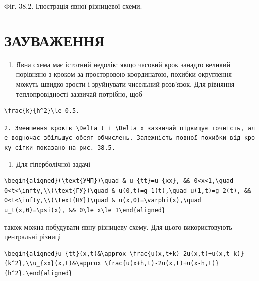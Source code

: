 \documentclass[
  ukrainian,
]{article}
\providecommand{\tightlist}{%
  \setlength{\itemsep}{0pt}\setlength{\parskip}{0pt}}
\begin{document}
Фіг. 38.2. Ілюстрація явної різницевої схеми.

\section{ЗАУВАЖЕННЯ}\label{ux437ux430ux443ux432ux430ux436ux435ux43dux43dux44f-9}

\begin{enumerate}
\def\labelenumi{\arabic{enumi}.}
\tightlist
\item
  Явна схема має істотний недолік: якщо часовий крок занадто великий
  порівняно з кроком за просторовою координатою, похибки округлення
  можуть швидко зрости і зруйнувати чисельний розв'язок. Для рівняння
  теплопровідності зазвичай потрібно, щоб
\end{enumerate}

\begin{verbatim}
\frac{k}{h^2}\le 0.5.
\end{verbatim}

\texttt{2.\ Зменшення\ кроків\ \textquotesingle{}\textbackslash{}Delta\ t\textquotesingle{}\ і\ \textquotesingle{}\textbackslash{}Delta\ x\textquotesingle{}\ зазвичай\ підвищує\ точність,\ але\ водночас\ збільшує\ обсяг\ обчислень.\ Залежність\ повної\ похибки\ від\ кроку\ сітки\ показано\ на\ рис.\ 38.5.}

\begin{enumerate}
\def\labelenumi{\arabic{enumi}.}
\setcounter{enumi}{2}
\tightlist
\item
  Для гіперболічної задачі
\end{enumerate}

\begin{verbatim}
\begin{aligned}(\text{УЧП})\quad & u_{tt}=u_{xx}, && 0<x<1,\quad 0<t<\infty,\\(\text{ГУ})\quad & u(0,t)=g_1(t),\quad u(1,t)=g_2(t), && 0<t<\infty,\\(\text{НУ})\quad & u(x,0)=\varphi(x),\quad u_t(x,0)=\psi(x), && 0\le x\le 1\end{aligned}
\end{verbatim}

також можна побудувати явну різницеву схему. Для цього використовують
центральні різниці

\begin{verbatim}
\begin{aligned}u_{tt}(x,t)&\approx \frac{u(x,t+k)-2u(x,t)+u(x,t-k)}{k^2},\\u_{xx}(x,t)&\approx \frac{u(x+h,t)-2u(x,t)+u(x-h,t)}{h^2}.\end{aligned}
\end{verbatim}
\end{document}
